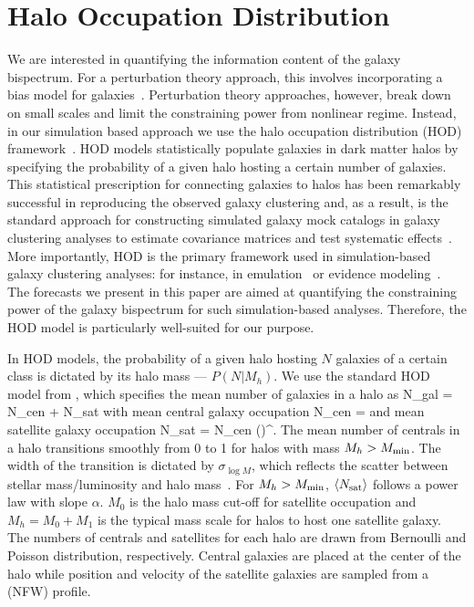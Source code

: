 \section{Halo Occupation Distribution} \label{sec:hod}  
We are interested in quantifying the information content of the galaxy bispectrum. 
For a perturbation theory approach, this involves incorporating a bias model 
for galaxies~\citep[\emph{e.g.}][]{sefusatti2006, yankelevich2019, chudaykin2019}.
Perturbation theory approaches, however, break down on small scales and limit
the constraining power from nonlinear regime. Instead, in our simulation based 
approach we use the halo occupation distribution (HOD) 
framework~\citep[\emph{e.g.}][]{benson2000, peacock2000, seljack2000, berlind2002,
cooray2002, zheng2005, leauthaud2012, tinker2013, zentner2016, vakili2019}.
HOD models statistically populate galaxies in dark matter halos by specifying
the probability of a given halo hosting a certain number of galaxies. This 
statistical prescription for connecting galaxies to halos has been remarkably 
successful in reproducing the observed galaxy clustering and, as a result, is the standard approach for constructing 
simulated galaxy mock catalogs in galaxy clustering analyses to estimate covariance 
matrices and test systematic effects~\citep[\emph{e.g.}][]{rodriguez-torres2016, rodriguez-torres2017, beutler2017}. 
More importantly, HOD is the primary framework used in simulation-based galaxy
clustering analyses: for instance, in emulation~\citep[\eg][]{mcclintock2018,
zhai2019} or evidence modeling~\citep[\eg][]{lange2019}. The forecasts we
present in this paper are aimed at quantifying the constraining power of the
galaxy bispectrum for such simulation-based analyses. Therefore, the HOD model
is particularly well-suited for our purpose.

In HOD models, the probability of a given halo hosting $N$ galaxies of a
certain class is dictated by its halo mass --- $P(N|M_h)$. We use the standard
HOD model from \cite{zheng2007}, which specifies the mean number of galaxies in
a halo as
\beq
\langle N_{\rm gal} \rangle = \langle N_{\rm cen} \rangle + \langle N_{\rm sat} \rangle
\eeq
with mean central galaxy occupation
\beq \label{eq:Ncen}
\langle N_{\rm cen} \rangle  = 
\eeq
and mean satellite galaxy occupation
\beq \label{eq:Nsat}
\langle N_{\rm sat} \rangle = \langle N_{\rm cen} \rangle \bigg(\bigg)^\alpha.
\eeq
The mean number of centrals in a halo transitions smoothly from 0 to 1 for halos 
with mass $M_h > M_{\rm min}$. The width of the transition is dictated by 
$\sigma_{\log M}$, which reflects the scatter between stellar mass/luminosity and 
halo mass~\citep{citecite}. For $M_h > M_{\rm min}$, 
$\langle N_{\rm sat} \rangle$ follows a power law with slope $\alpha$. $M_0$ 
is the halo mass cut-off for satellite occupation and $M_h = M_0 + M_1$ is 
the typical mass scale for halos to host one satellite galaxy. The numbers 
of centrals and satellites for each halo are drawn from Bernoulli and Poisson 
distribution, respectively. Central galaxies are placed at the center of the
halo while position and velocity of the satellite galaxies are sampled from a 
\cite{navarro1997} (NFW) profile. 

